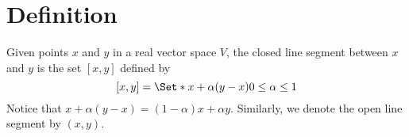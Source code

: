 
\section*{Definition}

Given points $x$ and $y$ in a real vector space $V$, the closed line segment between $x$ and $y$ is the set $[x, y]$ defined by
\[
[x,y] = \Set*{x + \alpha (y-x)}{0 \leq \alpha  \leq 1}
\]
Notice that $x + \alpha (y - x) = (1-\alpha )x + \alpha y$.
Similarly, we denote the open line segment by $(x, y)$.

\blankpage